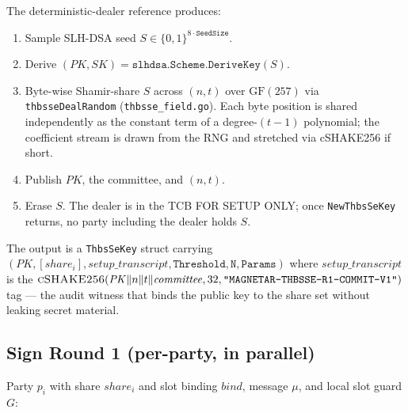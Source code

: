 The deterministic-dealer reference produces:

\begin{enumerate}[leftmargin=2em,nosep]
  \item Sample SLH-DSA seed $S \in \{0,1\}^{8 \cdot \texttt{SeedSize}}$.
  \item Derive $(\mathit{PK}, \mathit{SK}) =
        \texttt{slhdsa.Scheme.DeriveKey}(S)$.
  \item Byte-wise Shamir-share $S$ across $(n, t)$ over
        $\mathrm{GF}(257)$ via
        \texttt{thbsseDealRandom} (\texttt{thbsse\_field.go}).
        Each byte position is shared independently as the
        constant term of a degree-$(t-1)$ polynomial; the
        coefficient stream is drawn from the RNG and stretched
        via cSHAKE256 if short.
  \item Publish $\mathit{PK}$, the committee, and $(n, t)$.
  \item Erase $S$. The dealer is in the TCB FOR SETUP ONLY;
        once \texttt{NewThbsSeKey} returns, no party including
        the dealer holds $S$.
\end{enumerate}

The output is a \texttt{ThbsSeKey} struct carrying
$(\mathit{PK}, [\mathit{share}_i], \mathit{setup\_transcript},
\texttt{Threshold}, \texttt{N}, \texttt{Params})$ where
$\mathit{setup\_transcript}$ is the
$\textsc{cSHAKE256}(\mathit{PK} \| n \| t \| \mathit{committee},
32, \texttt{"MAGNETAR-THBSSE-R1-COMMIT-V1"})$ tag --- the audit
witness that binds the public key to the share set without
leaking secret material.

\subsection{Sign Round 1 (per-party, in parallel)}
\label{sec:thbsse:round1}

Party $p_i$ with share $\mathit{share}_i$ and slot binding
$\mathit{bind}$, message $\mu$, and local slot guard $G$:

